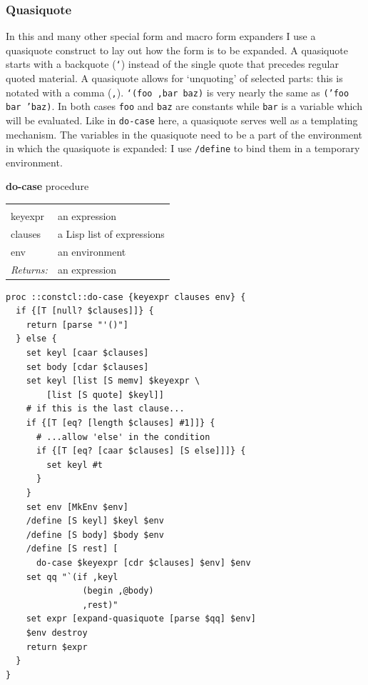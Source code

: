 \documentclass[twoside,9pt]{report}
\begin{document}
\begin{pulledtext}
\subsubsection{Quasiquote}
\label{quasiquote}


In this and many other special form and macro form expanders I use a quasiquote construct to lay out how the form is to be expanded. A quasiquote starts with a backquote (\texttt{`}) instead of the single quote that precedes regular quoted material. A quasiquote allows for `unquoting' of selected parts: this is notated with a comma (\texttt{,}). \texttt{`(foo ,bar baz)} is very nearly the same as \texttt{('foo bar 'baz)}. In both cases \texttt{foo} and \texttt{baz} are constants while \texttt{bar} is a variable which will be evaluated. Like in \texttt{do-case} here, a quasiquote serves well as a templating mechanism. The variables in the quasiquote need to be a part of the environment in which the quasiquote is expanded: I use \texttt{/define} to bind them in a temporary environment.

\end{pulledtext}



\textbf{do-case} procedure

\noindent\begin{tabular}{ |p{1.9cm} p{8cm}| }
\hline
\rowcolor[HTML]{CCCCCC} \multicolumn{2}{|l|}{\bf do-case (internal)} \\
keyexpr & an expression \\
clauses & a Lisp list of expressions \\
env & an environment \\
\textit{Returns:} & an expression \\
\hline
\end{tabular}
\begin{lstlisting}
proc ::constcl::do-case {keyexpr clauses env} {
  if {[T [null? $clauses]]} {
    return [parse "'()"]
  } else {
    set keyl [caar $clauses]
    set body [cdar $clauses]
    set keyl [list [S memv] $keyexpr \
        [list [S quote] $keyl]]
    # if this is the last clause...
    if {[T [eq? [length $clauses] #1]]} {
      # ...allow 'else' in the condition
      if {[T [eq? [caar $clauses] [S else]]]} {
        set keyl #t
      }
    }
    set env [MkEnv $env]
    /define [S keyl] $keyl $env
    /define [S body] $body $env
    /define [S rest] [
      do-case $keyexpr [cdr $clauses] $env] $env
    set qq "`(if ,keyl
               (begin ,@body)
               ,rest)"
    set expr [expand-quasiquote [parse $qq] $env]
    $env destroy
    return $expr
  }
}
\end{lstlisting}
\end{document}
